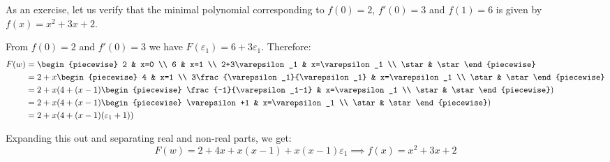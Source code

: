 \begin{example}
    As an exercise, let us verify that the minimal polynomial corresponding to $f(0)=2$, $f'(0)=3$ and $f(1)=6$ is given by $f(x)=x^2+3x+2$.

    From $f(0)=2$ and $f'(0)=3$ we have $F(\varepsilon_1)=6+3\varepsilon_1$. Therefore:
    \begin{align*}
        F(w) &= \begin{piecewise}
            2 & x=0 \\
            6 & x=1 \\
            2+3\varepsilon_1 & x=\varepsilon_1 \\
            \star & \star
        \end{piecewise} \\
        &= 2+x\begin{piecewise}
            4 & x=1 \\
            3\frac{\varepsilon_1}{\varepsilon_1} & x=\varepsilon_1 \\
            \star & \star
        \end{piecewise} \\
        &= 2+x\paren*{4+(x-1)\begin{piecewise}
            \frac{-1}{\varepsilon_1-1} & x=\varepsilon_1 \\
            \star & \star
        \end{piecewise}} \\
        &= 2+x\paren*{4+(x-1)\begin{piecewise}
            \varepsilon+1 & x=\varepsilon_1 \\
            \star & \star
        \end{piecewise}} \\
        &= 2+x\paren*{4+(x-1)(\varepsilon_1+1)}
    \end{align*}

    Expanding this out and separating real and non-real parts, we get:
    $$
        F(w)=2+4x+x(x-1)+x(x-1)\varepsilon_1 \implies f(x)=x^2+3x+2
    $$
\end{example}

\newpage